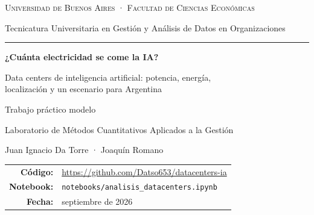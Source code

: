 \documentclass[11pt,a4paper]{article}
\newcommand{\gw}[1]{#1~GW}
\begin{document}
\begin{titlepage}
\centering
{\scshape Universidad de Buenos Aires · Facultad de Ciencias Económicas\par}
{\small Tecnicatura Universitaria en Gestión y Análisis de Datos en Organizaciones\par}
\vspace{0.4cm}\rule{\textwidth}{0.6pt}\vspace{2.2cm}

{\Huge\bfseries ¿Cuánta electricidad se come la IA?\par}
\vspace{0.5cm}
{\Large Data centers de inteligencia artificial: potencia, energía,\\ localización y un escenario para Argentina\par}
\vspace{1.8cm}

{\large Trabajo práctico modelo\par}
\vspace{0.3cm}
{Laboratorio de Métodos Cuantitativos Aplicados a la Gestión\par}
\vspace{0.6cm}
{\large Juan Ignacio Da Torre \quad · \quad Joaquín Romano\par}

\vfill
\begin{tabular}{rl}
\textbf{Código:} & \url{https://github.com/Datso653/datacenters-ia} \\
\textbf{Notebook:} & \texttt{notebooks/analisis\_datacenters.ipynb} \\
\textbf{Fecha:} & septiembre de 2026 \\
\end{tabular}
\vspace{1cm}
\end{titlepage}

\begin{abstract}
\noindent
Este trabajo cuantifica la demanda eléctrica de los grandes data centers de inteligencia artificial y la dimensiona frente al sistema eléctrico argentino. Se combinan cuatro fuentes públicas —Epoch AI, la EIA de Estados Unidos y Our World in Data— unidas por nombre, estado y país, y se valida cada unión con consultas SQL equivalentes. Sobre la serie de potencia instalada se aplican derivadas (velocidad de instalación) e integrales (energía consumida). Los 69 data centers operativos suman \gw{12,9} y consumen del orden de 118~TWh al año, el 73\,\% de la demanda eléctrica argentina; con las obras en curso, la cifra se duplicaría respecto de ese total. En Estados Unidos se ubican en estados con electricidad industrial más barata pero con un 62\,\% de generación fósil. Un proyecto de 500~MW en Argentina demandaría el 2,8\,\% de la electricidad del país y emitiría 1,6~Mt de CO$_2$ anuales con la red promedio.
\end{abstract}
\end{document}
